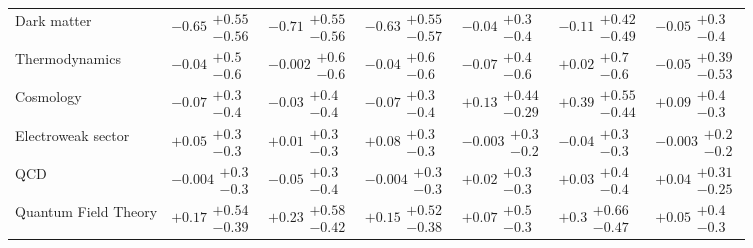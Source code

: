 \begin{table}[H]
\begin{tabular}{lllllll}
Dark matter & $\bm{-0.65}\substack{+0.55 \\ -0.56}$ & $\bm{-0.71}\substack{+0.55 \\ -0.56}$ & $\bm{-0.63}\substack{+0.55 \\ -0.57}$ & $-0.04\substack{+0.3 \\ -0.4}$ & $-0.11\substack{+0.42 \\ -0.49}$ & $-0.05\substack{+0.3 \\ -0.4}$ \\
Thermodynamics & $-0.04\substack{+0.5 \\ -0.6}$ & $-0.002\substack{+0.6 \\ -0.6}$ & $-0.04\substack{+0.6 \\ -0.6}$ & $-0.07\substack{+0.4 \\ -0.6}$ & $+0.02\substack{+0.7 \\ -0.6}$ & $-0.05\substack{+0.39 \\ -0.53}$ \\
Cosmology & $-0.07\substack{+0.3 \\ -0.4}$ & $-0.03\substack{+0.4 \\ -0.4}$ & $-0.07\substack{+0.3 \\ -0.4}$ & $+0.13\substack{+0.44 \\ -0.29}$ & $+0.39\substack{+0.55 \\ -0.44}$ & $+0.09\substack{+0.4 \\ -0.3}$ \\
Electroweak sector & $+0.05\substack{+0.3 \\ -0.3}$ & $+0.01\substack{+0.3 \\ -0.3}$ & $+0.08\substack{+0.3 \\ -0.3}$ & $-0.003\substack{+0.3 \\ -0.2}$ & $-0.04\substack{+0.3 \\ -0.3}$ & $-0.003\substack{+0.2 \\ -0.2}$ \\
QCD & $-0.004\substack{+0.3 \\ -0.3}$ & $-0.05\substack{+0.3 \\ -0.4}$ & $-0.004\substack{+0.3 \\ -0.3}$ & $+0.02\substack{+0.3 \\ -0.3}$ & $+0.03\substack{+0.4 \\ -0.4}$ & $+0.04\substack{+0.31 \\ -0.25}$ \\
Quantum Field Theory & $+0.17\substack{+0.54 \\ -0.39}$ & $+0.23\substack{+0.58 \\ -0.42}$ & $+0.15\substack{+0.52 \\ -0.38}$ & $+0.07\substack{+0.5 \\ -0.3}$ & $+0.3\substack{+0.66 \\ -0.47}$ & $+0.05\substack{+0.4 \\ -0.3}$ \\

\end{tabular}
\end{table}
